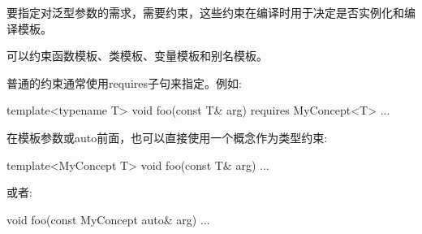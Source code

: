 要指定对泛型参数的需求，需要约束，这些约束在编译时用于决定是否实例化和编译模板。

可以约束函数模板、类模板、变量模板和别名模板。

普通的约束通常使用requires子句来指定。例如:

\begin{cpp}
template<typename T>
void foo(const T& arg)
requires MyConcept<T>
...
\end{cpp}

在模板参数或auto前面，也可以直接使用一个概念作为类型约束:

\begin{cpp}
template<MyConcept T>
void foo(const T& arg)
...
\end{cpp}

或者:

\begin{cpp}
void foo(const MyConcept auto& arg)
...
\end{cpp}












